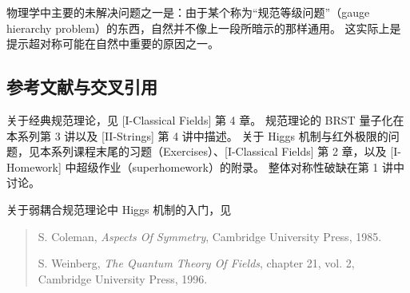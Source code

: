 物理学中主要的未解决问题之一是：由于某个称为“规范等级问题”（gauge hierarchy problem）的东西，自然并不像上一段所暗示的那样通用。
这实际上是提示超对称可能在自然中重要的原因之一。

\subsection{参考文献与交叉引用}

关于经典规范理论，见 [I-Classical Fields] 第 4 章。
规范理论的 BRST 量子化在本系列第 3 讲以及 [II-Strings] 第 4 讲中描述。
关于 Higgs 机制与红外极限的问题，见本系列课程末尾的习题（Exercises）、[I-Classical Fields] 第 2 章，以及 [I-Homework] 中超级作业（superhomework）的附录。
整体对称性破缺在第 1 讲中讨论。

关于弱耦合规范理论中 Higgs 机制的入门，见
\begin{quote}
S. Coleman, \textit{Aspects Of Symmetry}, Cambridge University Press, 1985.

S. Weinberg, \textit{The Quantum Theory Of Fields}, chapter 21, vol. 2, Cambridge University Press, 1996.
\end{quote}

